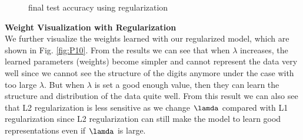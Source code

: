 \documentclass{article} %
\begin{document}
\begin{figure}%
	\centering
	\qquad
	\caption{final test accuracy using regularization}%
	\label{fig:P9}%
\end{figure}

\textbf{Weight Visualization with Regularization}\\
We further visualize the weights learned with our regularized model, which are shown in Fig. \ref{fig:P10}. From the results we can see that when $\lambda$ increases, the learned parameters (weights) become simpler and cannot represent the data very well since we cannot see the structure of the digits anymore under the case with too large $\lambda$. But when $\lambda$ is set a good enough value, then they can learn the structure and distribution of the data quite well. From this result we can also see that L2 regularization is less sensitive as we change $\lamda$ compared with L1 regularization since L2 regularization can still make the model to learn good representations even if $\lamda$ is large.
\end{document}
